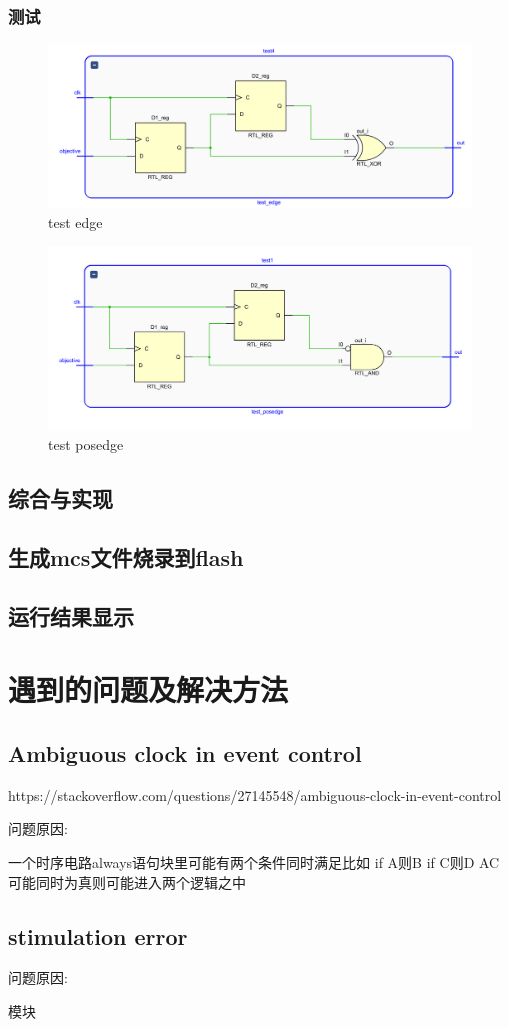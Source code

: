 \documentclass[UTF8]{article}
\begin{document}
\subsubsection{测试}
\begin{figure}[htbp]
    \centering
    \includegraphics[scale=0.45]{test_edge.PNG}
    \caption{test edge}
\end{figure}
\begin{figure}[htbp]
    \centering
    \includegraphics[scale=0.45]{test_posedge.PNG}
    \caption{test posedge}
\end{figure}
\subsection{综合与实现}
\subsection{生成mcs文件烧录到flash}
\subsection{运行结果显示}
\section{遇到的问题及解决方法}
\subsection{Ambiguous clock in event control}

https://stackoverflow.com/questions/27145548/ambiguous-clock-in-event-control

问题原因: 

一个时序电路always语句块里可能有两个条件同时满足比如
    if A则B
    if C则D
AC可能同时为真则可能进入两个逻辑之中

\subsection{stimulation error}
问题原因:

模块
\end{document}
